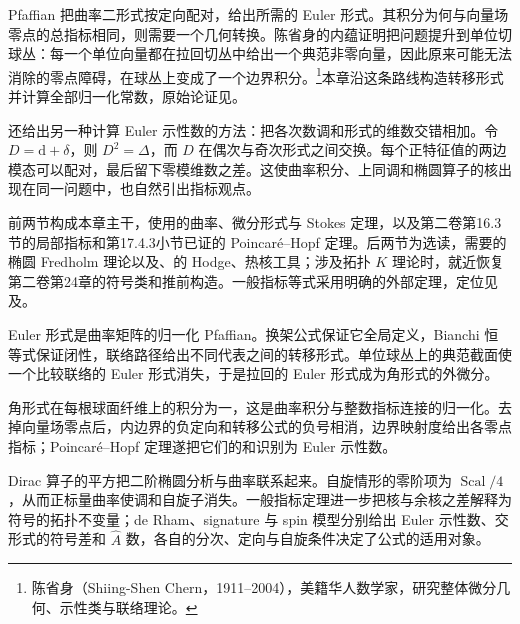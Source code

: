 \ProseParagraphBreak

Pfaffian 把曲率二形式按定向配对，给出所需的 Euler 形式。其积分为何与向量场零点的总指标相同，则需要一个几何转换。陈省身的内蕴证明把问题提升到单位切球丛：每一个单位向量都在拉回切丛中给出一个典范非零向量，因此原来可能无法消除的零点障碍，在球丛上变成了一个边界积分。\footnote{陈省身（Shiing-Shen Chern，1911--2004），美籍华人数学家，研究整体微分几何、示性类与联络理论。}本章沿这条路线构造转移形式并计算全部归一化常数，原始论证见\cite[第2--3节，第749--752页]{Chern1944GaussBonnet}。

\ProseParagraphBreak

还给出另一种计算 Euler 示性数的方法：把各次数调和形式的维数交错相加。令 \(D=\mathrm d+\delta\)，则 \(D^2=\Delta\)，而 \(D\) 在偶次与奇次形式之间交换。每个正特征值的两边模态可以配对，最后留下零模维数之差。这使曲率积分、上同调和椭圆算子的核出现在同一问题中，也自然引出指标观点。

\ProseParagraphBreak

前两节构成本章主干，使用的曲率、微分形式与 Stokes 定理，以及第二卷第16.3节的局部指标和第17.4.3小节已证的 Poincaré--Hopf 定理。后两节为选读，需要的椭圆 Fredholm 理论以及、的 Hodge、热核工具；涉及拓扑 \(K\) 理论时，就近恢复第二卷第24章的符号类和推前构造。一般指标等式采用明确的外部定理，定位见\cite[第6节，定理(6.7)，第520页]{AtiyahSinger1968I}及\cite[第5--6节]{AtiyahSinger1968III}。






\begin{chaptersummary}
	Euler 形式是曲率矩阵的归一化 Pfaffian。换架公式保证它全局定义，Bianchi 恒等式保证闭性，联络路径给出不同代表之间的转移形式。单位球丛上的典范截面使一个比较联络的 Euler 形式消失，于是拉回的 Euler 形式成为角形式的外微分。

	\ProseParagraphBreak

	角形式在每根球面纤维上的积分为一，这是曲率积分与整数指标连接的归一化。去掉向量场零点后，内边界的负定向和转移公式的负号相消，边界映射度给出各零点指标；Poincaré--Hopf 定理遂把它们的和识别为 Euler 示性数。

	\ProseParagraphBreak

	Dirac 算子的平方把二阶椭圆分析与曲率联系起来。自旋情形的零阶项为 \(\operatorname{Scal}/4\)，从而正标量曲率使调和自旋子消失。一般指标定理进一步把核与余核之差解释为符号的拓扑不变量；de Rham、signature 与 spin 模型分别给出 Euler 示性数、交形式的符号差和 \(\widehat A\) 数，各自的分次、定向与自旋条件决定了公式的适用对象。
\end{chaptersummary}

